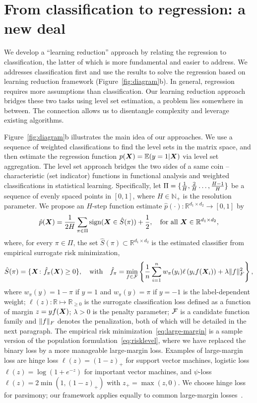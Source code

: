 \documentclass[11pt]{article}
\theoremstyle{definition}
\def\sign{\textup{sign}}
\begin{document}
\section{From classification to regression: a new deal}\label{sec:idea}
We develop a ``learning reduction'' approach by relating the regression to classification, the latter of which is more fundamental and easier to address. We addresses classification first and use the results to solve the regression based on learning reduction framework (Figure~\ref{fig:diagram}b). In general, regression requires more assumptions than classification. Our learning reduction approach bridges these two tasks using level set estimation, a problem lies somewhere in between. The connection allows us to disentangle complexity and leverage existing algorithms. 

Figure~\ref{fig:diagram}b illustrates the main idea of our approaches. We use a sequence of weighted classifications to find the level sets in the matrix space, and then estimate the regression function $p(\bm X)=\mathbb{E}(y=1|\bm X)$ via level set aggregation. The level set approach bridges the two sides of a same coin -- characteristic (set indicator) functions in functional analysis and weighted classifications in statistical learning. Specifically, let $\Pi=\{{1\over H},{2\over H} \ldots, {H-1\over H} \}$ be a sequence of evenly spaced points in $[0,1]$, where $H\in\mathbb{N}_{+}$ is the resolution parameter. We propose an $H$-step function estimate $\hat p(\cdot)\colon \mathbb{R}^{d_1\times d_2} \to [0,1]$ by
\begin{equation}\label{eq:stepfunction}
\hat p(\mX)= {1\over 2H}  \sum_{\pi \in \Pi} \sign (\mX\in \hat S(\pi))+{1\over 2},\quad \text{for all }\mX\in\mathbb{R}^{d_1\times d_2},
\end{equation}
where, for every $\pi\in\Pi$, the set $\hat S(\pi)\subset \mathbb{R}^{d_1\times d_2}$ is the estimated classifier from empirical surrogate risk minimization,
\begin{align}\label{eq:large-margin}
\hat S(\pi) = \{\bm X \colon \hat f_\pi(\bm X) \geq 0\}, \quad \text{with}\quad \hat f_\pi=\min_{f\in\mathcal{F}}\left\{ {1\over n}\sum_{i=1}^n w_{\pi}(y_i)\ell\left(y_if(\bm X_i)\right)+ \lambda \lVert f\rVert_F^2\right\},
\end{align}
where $w_\pi(y) = 1-\pi $ if $y = 1$ and $w_\pi(y)=\pi$ if $y = -1$ is the label-dependent weight; $\ell(z)\colon \mathbb{R}\mapsto \mathbb{R}_{\geq 0}$ is the surrogate classification loss defined as a function of margin $z=yf(\bm X)$; $\lambda>0$ is the penalty parameter; $\mathcal{F}$ is a candidate function family and $\lVert f\rVert_F$ denotes the penalization, both of which will be detailed in the next paragraph. The empirical risk minimization~\eqref{eq:large-margin} is a sample version of the population formulation~\eqref{eq:risklevel}, where we have replaced the binary loss by a more manageable large-margin loss. Examples of large-margin loss are hinge loss $\ell(z) = (1-z)_+$ for support vector machines, logistic loss $\ell(z) =\log(1+e^{-z})$ for important vector machines, and $\psi$-loss $\ell(z)=2\min(1,(1-z)_+)$ with $z_{+}=\max(z,0)$. We choose hinge loss for parsimony; our framework applies equally to common large-margin losses~\citep{bartlett2006convexity}. 
\end{document}
